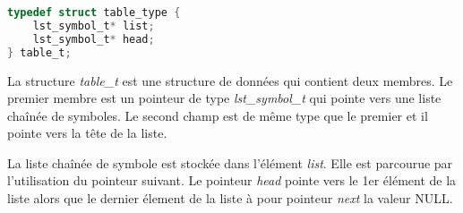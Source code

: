 \lstset{style=mystyle}
\begin{lstlisting}[language=C, caption=Structure d'une table de symbole]
typedef struct table_type {
    lst_symbol_t* list;
    lst_symbol_t* head;
} table_t;
\end{lstlisting}

La structure \textit{table\_t} est une structure de données qui contient deux membres. Le premier membre est un pointeur de type \textit{lst\_symbol\_t} qui pointe vers une liste chaînée de symboles. Le second champ est de même type que le premier et il pointe vers la tête de la liste.

La liste chaînée de symbole est stockée dans l'élément \textit{list}. Elle est parcourue par l'utilisation du pointeur suivant. 
Le pointeur \textit{head} pointe vers le 1er élément de la liste alors que le dernier élement de la liste à pour pointeur \textit{next} la valeur NULL.
\newpage